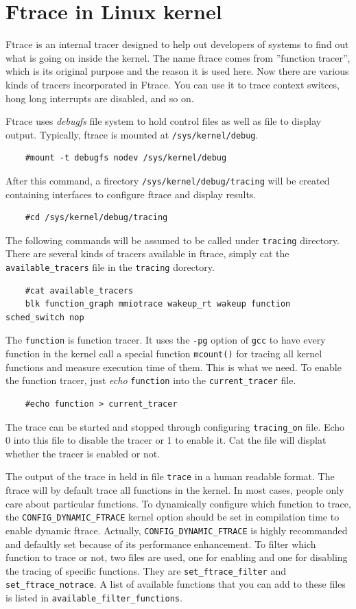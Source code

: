 \section{Ftrace in Linux kernel}
Ftrace is an internal tracer designed to help out developers of systems to
find out what is going on inside the kernel. The name ftrace comes from
''function tracer'', which is its original purpose and the reason it is 
used here. Now there are various kinds of tracers incorporated in Ftrace.
You can use it to trace context switces, hong long interrupts are disabled,
and so on.

Ftrace uses \emph{debugfs} file system to hold control files as well as
file to display output. 
Typically, ftrace is mounted at \texttt{/sys/kernel/debug}.
\begin{lstlisting}
	#mount -t debugfs nodev /sys/kernel/debug
\end{lstlisting}
After this command, a firectory \texttt{/sys/kernel/debug/tracing} will 
be created containing interfaces to configure ftrace and display results.
\begin{lstlisting}
	#cd /sys/kernel/debug/tracing
\end{lstlisting}
The following commands will be assumed to be called under \texttt{tracing}
directory.
There are several kinds of tracers available in ftrace, simply cat the
\texttt{available\_tracers} file in the \texttt{tracing} dorectory.
\begin{lstlisting}
	#cat available_tracers
	blk function_graph mmiotrace wakeup_rt wakeup function sched_switch nop
\end{lstlisting}
The \texttt{function} is function tracer. It uses the \texttt{-pg} option
of \texttt{gcc} to have every function in the kernel call a special function
\texttt{mcount()} for tracing all kernel functions and measure execution time 
of them.  This is what we need. To enable the function tracer, just \emph{echo} \texttt{function} into the \texttt{current\_tracer}
file.
\begin{lstlisting}
	#echo function > current_tracer
\end{lstlisting}
The trace can be started and stopped through configuring \texttt{tracing\_on}
file. Echo 0 into this file to disable the tracer or 1 to enable it. Cat the
file will displat whether the tracer is enabled or not.

The output of the trace in held in file \texttt{trace} in a human readable
format. The ftrace will by default trace all functions in the kernel. In
most cases, people only care about particular functions. To dynamically
configure which function to trace, the \texttt{CONFIG\_DYNAMIC\_FTRACE}
kernel option should be set in compilation time  to enable dynamic ftrace. 
Actually, \texttt{CONFIG\_DYNAMIC\_FTRACE} is highly recommanded and defaultly
set because of its performance enhancement. To filter which function to trace
or not, two files are used, one for enabling and one for disabling the 
tracing of specific functions. They are \texttt{set\_ftrace\_filter} and 
\texttt{set\_ftrace\_notrace}. A list of available functions that you can add
to these files is listed in \texttt{available\_filter\_functions}.

